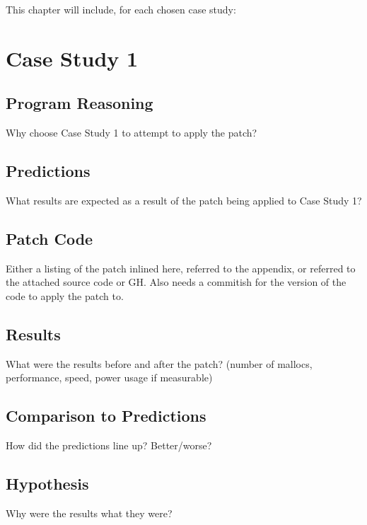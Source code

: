 This chapter will include, for each chosen case study:

\section{Case Study 1}

\subsection{Program Reasoning}

Why choose Case Study 1 to attempt to apply the patch?

\subsection{Predictions}

What results are expected as a result of the patch being applied to Case Study 1?

\subsection{Patch Code}

Either a listing of the patch inlined here, referred to the appendix, or referred to the attached source code or GH\@. Also needs a commitish for the version of the code to apply the patch to.

\subsection{Results}

What were the results before and after the patch? (number of mallocs, performance, speed, power usage if measurable)

\subsection{Comparison to Predictions}

How did the predictions line up? Better/worse?

\subsection{Hypothesis}

Why were the results what they were?
